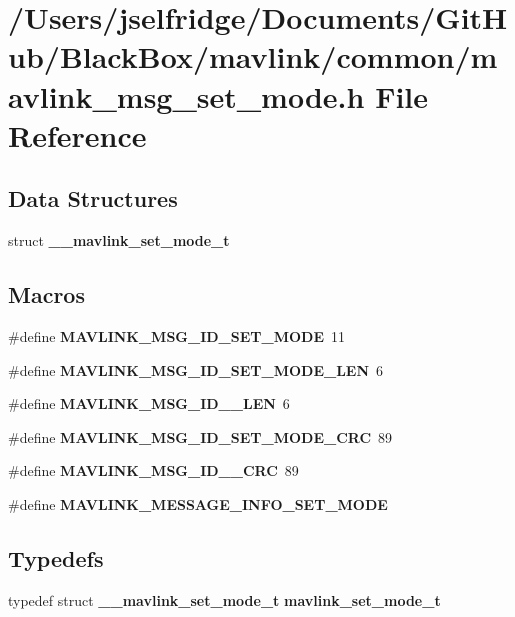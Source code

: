 \section{/\+Users/jselfridge/\+Documents/\+Git\+Hub/\+Black\+Box/mavlink/common/mavlink\+\_\+msg\+\_\+set\+\_\+mode.h File Reference}
\label{mavlink__msg__set__mode_8h}
\subsection*{Data Structures}
\begin{DoxyCompactItemize}
\item 
struct \textbf{ \+\_\+\+\_\+mavlink\+\_\+set\+\_\+mode\+\_\+t}
\end{DoxyCompactItemize}
\subsection*{Macros}
\begin{DoxyCompactItemize}
\item 
\#define \textbf{ M\+A\+V\+L\+I\+N\+K\+\_\+\+M\+S\+G\+\_\+\+I\+D\+\_\+\+S\+E\+T\+\_\+\+M\+O\+DE}~11
\item 
\#define \textbf{ M\+A\+V\+L\+I\+N\+K\+\_\+\+M\+S\+G\+\_\+\+I\+D\+\_\+\+S\+E\+T\+\_\+\+M\+O\+D\+E\+\_\+\+L\+EN}~6
\item 
\#define \textbf{ M\+A\+V\+L\+I\+N\+K\+\_\+\+M\+S\+G\+\_\+\+I\+D\+\_\+\_\+\+L\+EN}~6
\item 
\#define \textbf{ M\+A\+V\+L\+I\+N\+K\+\_\+\+M\+S\+G\+\_\+\+I\+D\+\_\+\+S\+E\+T\+\_\+\+M\+O\+D\+E\+\_\+\+C\+RC}~89
\item 
\#define \textbf{ M\+A\+V\+L\+I\+N\+K\+\_\+\+M\+S\+G\+\_\+\+I\+D\+\_\+\_\+\+C\+RC}~89
\item 
\#define \textbf{ M\+A\+V\+L\+I\+N\+K\+\_\+\+M\+E\+S\+S\+A\+G\+E\+\_\+\+I\+N\+F\+O\+\_\+\+S\+E\+T\+\_\+\+M\+O\+DE}
\end{DoxyCompactItemize}
\subsection*{Typedefs}
\begin{DoxyCompactItemize}
\item 
typedef struct \textbf{ \+\_\+\+\_\+mavlink\+\_\+set\+\_\+mode\+\_\+t} \textbf{ mavlink\+\_\+set\+\_\+mode\+\_\+t}
\end{DoxyCompactItemize}


